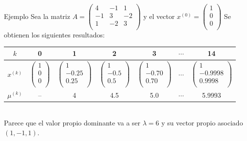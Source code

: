\documentclass[11pt]{beamer}
\begin{document}
    \begin{frame}{Ejemplo}
      Sea la matriz $A=\left(\begin{array}{ccc}
        4 & -1& 1\\
-1 & 3 & -2\\
1 & -2 & 3\\
       \end{array}\right)$ y el vector $x^{(0)}=\left(\begin{array}{c}
        1\\0\\0\\\end{array}\right)$   
    Se obtienen los siguientes resultados:\\[10pt]
    {\scriptsize
    \begin{tabular}{|c|c|c|c|c|c|c|}\hline
      $k$ & 0 & 1 & 2 & 3 & $\cdots$ & 14\\\hline
      $x^{(k)}$ & $\left(\begin{array}{c}1\\0\\0\\\end{array}\right)$ & $\left(\begin{array}{c}1\\-0.25\\0.25\\\end{array}\right)$ & $\left(\begin{array}{c}1\\-0.5\\0.5\\\end{array}\right)$ & $\left(\begin{array}{c}1\\-0.70\\0.70\\\end{array}\right)$ & $\cdots$ & $\left(\begin{array}{c}1\\-0.9998\\0.9998\\\end{array}\right)$\\\hline
      $\mu^{(k)}$ & -- & 4 & 4.5 & 5.0 & $\cdots$ & 5.9993\\\hline
    \end{tabular}}\\[10pt]
    Parece que el valor propio dominante va a ser $\lambda = 6$ y su vector propio asociado $(1,-1,1)$.
  \end{frame}
\end{document}
